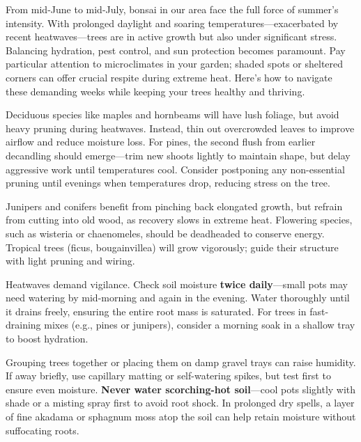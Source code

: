 \label{2025-07-care}
\noindent  
From mid\--June to mid\--July, bonsai in our area face the full force of summer's intensity.
With prolonged daylight and soaring temperatures---exacerbated by recent heatwaves---trees are in active growth but also under significant stress.
Balancing hydration, pest control, and sun protection becomes paramount.
Pay particular attention to microclimates in your garden; shaded spots or sheltered corners can offer crucial respite during extreme heat.
Here's how to navigate these demanding weeks while keeping your trees healthy and thriving.

\medskip  
{}  
\noindent  
Deciduous species like maples and hornbeams will have lush foliage, but avoid heavy pruning during heatwaves.
Instead, thin out overcrowded leaves to improve airflow and reduce moisture loss.
For pines, the second flush from earlier decandling should emerge---trim new shoots lightly to maintain shape, but delay aggressive work until temperatures cool.
Consider postponing any non\--essential pruning until evenings when temperatures drop, reducing stress on the tree.

Junipers and conifers benefit from pinching back elongated growth, but refrain from cutting into old wood, as recovery slows in extreme heat.
Flowering species, such as wisteria or chaenomeles, should be deadheaded to conserve energy.
Tropical trees (ficus, bougainvillea) will grow vigorously; guide their structure with light pruning and wiring.

\medskip  
{}  
\noindent  
Heatwaves demand vigilance.
Check soil moisture \textbf{twice daily}---small pots may need watering by mid\--morning and again in the evening.
Water thoroughly until it drains freely, ensuring the entire root mass is saturated.
For trees in fast\--draining mixes (e.g., pines or junipers), consider a morning soak in a shallow tray to boost hydration.

Grouping trees together or placing them on damp gravel trays can raise humidity.
If away briefly, use capillary matting or self\--watering spikes, but test first to ensure even moisture. \textbf{Never water scorching\--hot soil}---cool pots slightly with shade or a misting spray first to avoid root shock.
In prolonged dry spells, a layer of fine akadama or sphagnum moss atop the soil can help retain moisture without suffocating roots.

